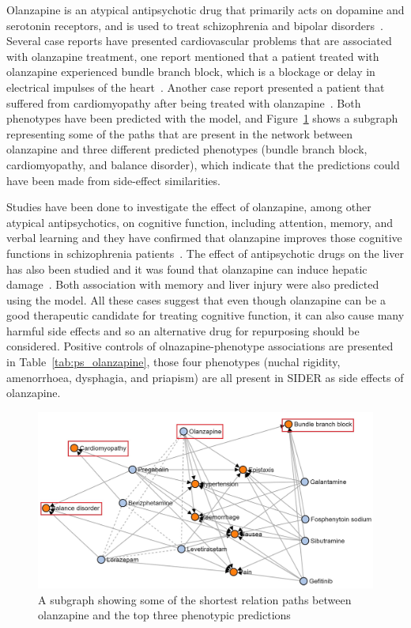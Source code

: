 Olanzapine is an atypical antipsychotic drug that primarily acts on dopamine and serotonin receptors, and is used to treat schizophrenia and bipolar disorders~\cite{thomas_olanzapine_2019}.
Several case reports have presented cardiovascular problems that are associated with olanzapine treatment, one report mentioned that a patient treated with olanzapine experienced bundle branch block, which is a blockage or delay in electrical impulses of the heart~\cite{ninan_case_2017}.
Another case report presented a patient that suffered from cardiomyopathy after being treated with olanzapine~\cite{puttegowda_olanzapine_2016}.
Both phenotypes have been predicted with the model, and Figure~\ref{fig:olanzapine_phenotypes} shows a subgraph representing some of the paths that are present in the network between olanzapine and three different predicted phenotypes (bundle branch block, cardiomyopathy, and balance disorder), which indicate that the predictions could have been made from side-effect similarities.

Studies have been done to investigate the effect of olanzapine, among other atypical antipsychotics, on cognitive function, including attention, memory, and verbal learning and they have confirmed that olanzapine improves those cognitive functions in schizophrenia patients~\cite{mcgurk_cognitive_2004, smith_effects_2001, cuesta_effects_2001, purdon_neuropsychological_2000, bilder_neurocognitive_2002}.
The effect of antipsychotic drugs on the liver has also been studied and it was found that olanzapine can induce hepatic damage~\cite{lv_antipsychotic_2018}.
Both association with memory and liver injury were also predicted using the model. 
All these cases suggest that even though olanzapine can be a good therapeutic candidate for treating cognitive function, it can also cause many harmful side effects and so an alternative drug for repurposing should be considered.
Positive controls of olnazapine-phenotype associations are presented in Table~\ref{tab:ps_olanzapine}, those four phenotypes (nuchal rigidity, amenorrhoea, dysphagia, and priapism) are all present in \ac{SIDER} as side effects of olanzapine.

\begin{figure}[h!]
    \centering
    \includegraphics[scale=0.6]
    {figures/olanzapine_phenotypes.jpg}
    \caption[Olanzapine's path subgraph for all phenotypes]{\label{fig:olanzapine_phenotypes} A subgraph showing some of the shortest relation paths between olanzapine and the top three phenotypic predictions}
\end{figure}

